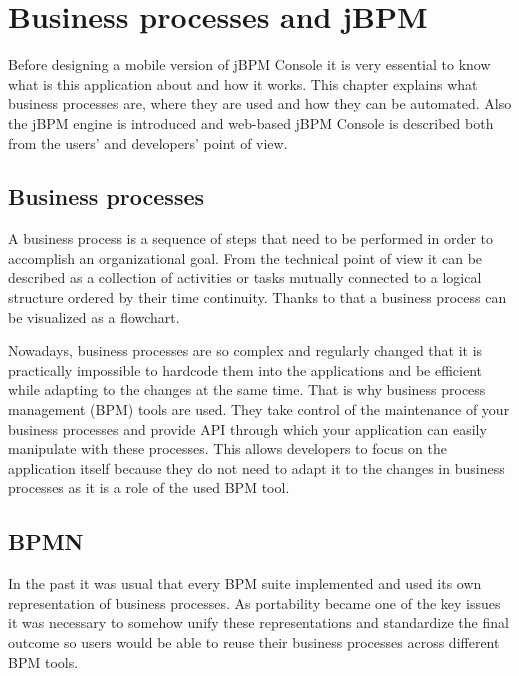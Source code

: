 \documentclass[12pt,oneside,final]{fithesis2}
\begin{document}
\chapter{Business processes and jBPM}
Before designing a mobile version of jBPM Console it is very essential to know what is this application about and how it works.
This chapter explains what business processes are, where they are used and how they can be automated. Also the jBPM engine is introduced and web-based jBPM Console is described both from the users' and developers' point of view.

\section{Business processes}
A business process is a sequence of steps that need to be performed in order to accomplish an organizational goal.
From the technical point of view it can be described as a collection of activities or tasks mutually connected to a logical structure ordered by their time continuity.
Thanks to that a business process can be visualized as a flowchart\footnotemark{}.

Nowadays, business processes are so complex and regularly changed that it is practically impossible to hardcode them into the applications and be efficient while adapting to the changes at the same time.
That is why business process management (BPM) tools are used. %
They take control of the maintenance of your business processes and provide API through which your application can easily manipulate with these processes.
This allows developers to focus on the application itself because they do not need to adapt it to the changes in business processes as it is a role of the used BPM tool.

\section{BPMN}
In the past it was usual that every BPM suite implemented and used its own representation of business processes.
As portability became one of the key issues it was necessary to somehow unify these representations and standardize the final outcome so users would be able to reuse their business processes across different BPM tools.
\end{document}
